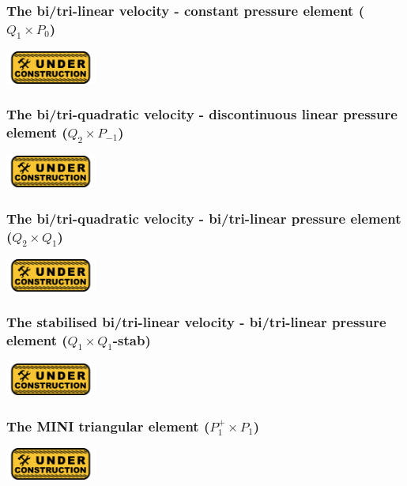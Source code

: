 \subsubsection{The bi/tri-linear velocity - constant pressure element ($Q_1\times P_0$)}
\includegraphics[width=3cm]{images/under_construction}

\subsubsection{The bi/tri-quadratic velocity - discontinuous linear pressure element ($Q_2 \times P_{-1}$)}
\includegraphics[width=3cm]{images/under_construction}

\subsubsection{The bi/tri-quadratic velocity - bi/tri-linear pressure element ($Q_2 \times Q_1$)}
\includegraphics[width=3cm]{images/under_construction}

\subsubsection{The stabilised bi/tri-linear velocity -  bi/tri-linear pressure element ($Q_1\times Q_1$-stab)}
\includegraphics[width=3cm]{images/under_construction}

\subsubsection{The MINI triangular element ($P_1^+\times P_1$)}
\includegraphics[width=3cm]{images/under_construction}


